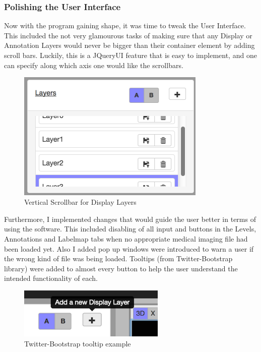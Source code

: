 \documentclass[a4paper,11pt,twoside]{article}
\begin{document}
\subsubsection{Polishing the User Interface}

Now with the program gaining shape, it was time to tweak the User Interface. This included the not very glamourous tasks of making sure that any Display or Annotation Layers would never be bigger than their container element by adding scroll bars. Luckily, this is a JQueryUI feature that is easy to implement, and one can specify along which axis one would like the scrollbars.

\begin{figure}[ht!]
\centering
\includegraphics[width=90mm]{graphics/scrollbar_01.png}
\caption{Vertical Scrollbar for Display Layers}
\label{fig:UIdesign1}
\end{figure}

Furthermore, I implemented changes that would guide the user better in terms of using the software. This included disabling of all input and buttons in the Levels, Annotations and Labelmap tabs when no appropriate medical imaging file had been loaded yet. Also I added pop up windows were introduced to warn a user if the wrong kind of file was being loaded. Tooltips (from Twitter-Bootstrap library) were added to almost every button to help the user understand the intended functionality of each.


\begin{figure}[ht!]
\centering
\includegraphics[width=70mm]{graphics/tooltipExample_01.png}
\caption{Twitter-Bootstrap tooltip example}
\label{fig:UIdesign1}
\end{figure}
\end{document}
